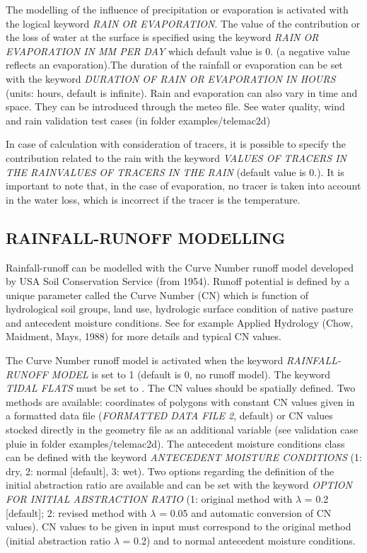  The modelling of the influence of precipitation or evaporation is activated with the logical keyword \textit{RAIN OR EVAPORATION}. The value of the contribution or the loss of water at the surface is specified using the keyword \textit{RAIN OR EVAPORATION IN MM PER DAY} which default value is 0. (a negative value reflects an evaporation).The duration of the rainfall or evaporation can be set with the keyword \textit{DURATION OF RAIN OR EVAPORATION IN HOURS} (units: hours, default is infinite). Rain and evaporation can also vary in time and space. They can be introduced through the meteo file. See water quality, wind and rain validation test cases (in folder examples/telemac2d)

 In case of calculation with consideration of tracers, it is possible to specify the contribution related to the rain with the keyword \textit{VALUES OF TRACERS IN THE RAINVALUES OF TRACERS IN THE RAIN} (default value is 0.). It is important to note that, in the case of evaporation, no tracer is taken into account in the water loss, which is incorrect if the tracer is the temperature.

\subsection{RAINFALL-RUNOFF MODELLING}

Rainfall-runoff can be modelled with the Curve Number runoff model developed by USA Soil Conservation Service (from 1954). Runoff potential is defined by a unique parameter called the Curve Number (CN) which is function of hydrological soil groups, land use, hydrologic surface condition of native pasture and antecedent moisture conditions. See for example Applied Hydrology (Chow, Maidment, Mays, 1988) for more details and typical CN values. 

The Curve Number runoff model is activated when the keyword \textit{RAINFALL-RUNOFF MODEL} is set to 1 (default is 0, no runoff model). The keyword \textit{TIDAL FLATS} must be set to . The CN values should be spatially defined. Two methods are available: coordinates of polygons with constant CN values given in a formatted data file (\textit{FORMATTED DATA FILE 2}, default) or CN values stocked directly in the geometry file as an additional variable (see validation case pluie in folder examples/telemac2d). The antecedent moisture conditions class can be defined with the keyword \textit{ANTECEDENT MOISTURE CONDITIONS} (1: dry, 2: normal [default], 3: wet). Two options regarding the definition of the initial abstraction ratio are available and can be set with the keyword \textit{OPTION FOR INITIAL ABSTRACTION RATIO} (1: original method with $\lambda$ = 0.2 [default]; 2: revised method with $\lambda$ = 0.05 and automatic conversion of CN values). CN values to be given in input must correspond to the original method (initial abstraction ratio $\lambda$ = 0.2) and to normal antecedent moisture conditions.

